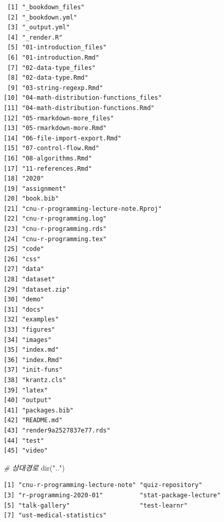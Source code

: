 \documentclass[
  11pt,
]{krantz}
\newenvironment{Shaded}{\begin{snugshade}}{\end{snugshade}}
\newcommand{\CommentTok}[1]{\textcolor[rgb]{0.37,0.37,0.37}{\textit{#1}}}
\newcommand{\FunctionTok}[1]{\textcolor[rgb]{0,0,0}{#1}}
\newcommand{\NormalTok}[1]{#1}
\newcommand{\StringTok}[1]{\textcolor[rgb]{0.5,0.5,0.5}{#1}}
\begin{document}
\begin{verbatim}
 [1] "_bookdown_files"                     
 [2] "_bookdown.yml"                       
 [3] "_output.yml"                         
 [4] "_render.R"                           
 [5] "01-introduction_files"               
 [6] "01-introduction.Rmd"                 
 [7] "02-data-type_files"                  
 [8] "02-data-type.Rmd"                    
 [9] "03-string-regexp.Rmd"                
[10] "04-math-distribution-functions_files"
[11] "04-math-distribution-functions.Rmd"  
[12] "05-rmarkdown-more_files"             
[13] "05-rmarkdown-more.Rmd"               
[14] "06-file-import-export.Rmd"           
[15] "07-control-flow.Rmd"                 
[16] "08-algorithms.Rmd"                   
[17] "11-references.Rmd"                   
[18] "2020"                                
[19] "assignment"                          
[20] "book.bib"                            
[21] "cnu-r-programming-lecture-note.Rproj"
[22] "cnu-r-programming.log"               
[23] "cnu-r-programming.rds"               
[24] "cnu-r-programming.tex"               
[25] "code"                                
[26] "css"                                 
[27] "data"                                
[28] "dataset"                             
[29] "dataset.zip"                         
[30] "demo"                                
[31] "docs"                                
[32] "examples"                            
[33] "figures"                             
[34] "images"                              
[35] "index.md"                            
[36] "index.Rmd"                           
[37] "init-funs"                           
[38] "krantz.cls"                          
[39] "latex"                               
[40] "output"                              
[41] "packages.bib"                        
[42] "README.md"                           
[43] "render9a2527837e77.rds"              
[44] "test"                                
[45] "video"                               
\end{verbatim}

\begin{Shaded}
\begin{Highlighting}[]
\CommentTok{\# 상대경로}
\FunctionTok{dir}\NormalTok{(}\StringTok{".."}\NormalTok{) }
\end{Highlighting}
\end{Shaded}

\begin{verbatim}
[1] "cnu-r-programming-lecture-note" "quiz-repository"               
[3] "r-programming-2020-01"          "stat-package-lecture"          
[5] "talk-gallery"                   "test-learnr"                   
[7] "ust-medical-statistics"        
\end{verbatim}
\end{document}
